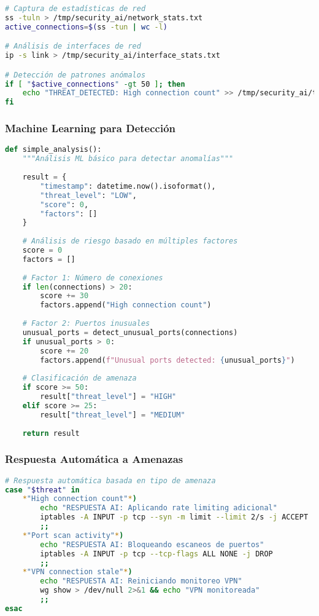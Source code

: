 \begin{lstlisting}[language=bash, caption=Monitoreo en tiempo real]
# Captura de estadísticas de red
ss -tuln > /tmp/security_ai/network_stats.txt
active_connections=$(ss -tun | wc -l)

# Análisis de interfaces de red
ip -s link > /tmp/security_ai/interface_stats.txt

# Detección de patrones anómalos
if [ "$active_connections" -gt 50 ]; then
    echo "THREAT_DETECTED: High connection count" >> /tmp/security_ai/threats.log
fi
\end{lstlisting}

\subsubsection{Machine Learning para Detección}

\begin{lstlisting}[language=python, caption=Algoritmo ML básico para anomalías]
def simple_analysis():
    """Análisis ML básico para detectar anomalías"""
    
    result = {
        "timestamp": datetime.now().isoformat(),
        "threat_level": "LOW",
        "score": 0,
        "factors": []
    }
    
    # Análisis de riesgo basado en múltiples factores
    score = 0
    factors = []
    
    # Factor 1: Número de conexiones
    if len(connections) > 20:
        score += 30
        factors.append("High connection count")
    
    # Factor 2: Puertos inusuales
    unusual_ports = detect_unusual_ports(connections)
    if unusual_ports > 0:
        score += 20
        factors.append(f"Unusual ports detected: {unusual_ports}")
    
    # Clasificación de amenaza
    if score >= 50:
        result["threat_level"] = "HIGH"
    elif score >= 25:
        result["threat_level"] = "MEDIUM"
    
    return result
\end{lstlisting}

\subsubsection{Respuesta Automática a Amenazas}

\begin{lstlisting}[language=bash, caption=Sistema de respuesta automática]
# Respuesta automática basada en tipo de amenaza
case "$threat" in
    *"High connection count"*)
        echo "RESPUESTA AI: Aplicando rate limiting adicional"
        iptables -A INPUT -p tcp --syn -m limit --limit 2/s -j ACCEPT
        ;;
    *"Port scan activity"*)
        echo "RESPUESTA AI: Bloqueando escaneos de puertos"
        iptables -A INPUT -p tcp --tcp-flags ALL NONE -j DROP
        ;;
    *"VPN connection stale"*)
        echo "RESPUESTA AI: Reiniciando monitoreo VPN"
        wg show > /dev/null 2>&1 && echo "VPN monitoreada"
        ;;
esac
\end{lstlisting}

